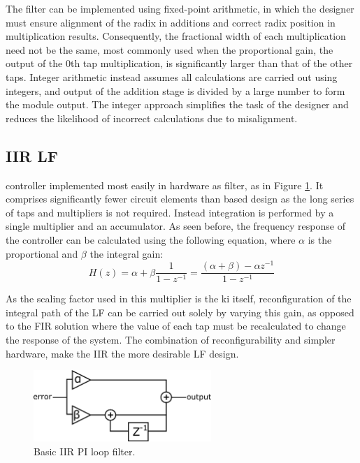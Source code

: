 The filter can be implemented using fixed-point arithmetic, in which the designer must ensure alignment of the radix in additions and correct radix position in multiplication results. Consequently, the fractional width of each multiplication need not be the same, most commonly used when the proportional gain, the output of the 0th tap multiplication, is significantly larger than that of the other taps. Integer arithmetic instead assumes all calculations are carried out using integers, and output of the addition stage is divided by a large number to form the module output. The integer approach simplifies the task of the designer and reduces the likelihood of incorrect calculations due to misalignment.

\subsection{\acs{IIR} \acl{LF}}
 controller implemented most easily in hardware as  filter, as in Figure \ref{fig:iir_pi}. It comprises significantly fewer circuit elements than  based design as the long series of taps and multipliers is not required. Instead integration is performed by a single multiplier and an accumulator. As seen before, the frequency response of the controller can be calculated using the following equation, where $\alpha$ is the proportional and $\beta$ the integral gain:
\begin{equation*}
	H(z) = \alpha + \beta\frac{1}{1-z^{-1}} = \frac{(\alpha + \beta) - \alpha z^{-1}}{1-z^{-1}}
\end{equation*}

As the scaling factor used in this multiplier is the \ac{ki} itself, reconfiguration of the integral path of the \acl{LF} can be carried out solely by varying this gain, as opposed to the \ac{FIR} solution where the value of each tap must be recalculated to change the response of the system. The combination of reconfigurability and simpler hardware, make the \ac{IIR} the more desirable \ac{LF} design.
\begin{figure}[h]
	\centering
	\includegraphics[width=0.6\textwidth]{../simple_pi.pdf}
	\caption[Basic \acs{IIR} \acs{PI} loop filter]{Basic \acs{IIR} \acs{PI} loop filter.}
	\label{fig:iir_pi}
\end{figure}

